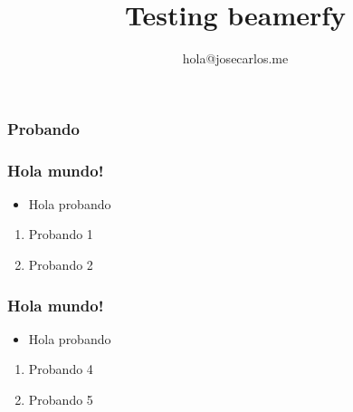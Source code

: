 \documentclass{beamer}
\author{hola@josecarlos.me}
\title{Testing beamerfy}
\begin{document}
	\begin{frame}
\frametitle{Probando}

\end{frame}
\begin{frame}
\frametitle{Hola mundo!}
\begin{itemize}
\item Hola probando
\end{itemize}
	\begin{enumerate}

		\item Probando 1

		\item Probando 2

	\end{enumerate}
\end{frame}
\begin{frame}
\frametitle{Hola mundo!}
\begin{itemize}
\item Hola probando
\end{itemize}
	\begin{enumerate}

		\item Probando 4

		\item Probando 5

	\end{enumerate}
\end{frame}
\end{document}
